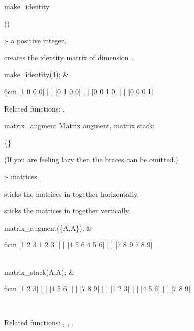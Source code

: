 \begin{Operator}{make_identity}

\begin{Syntax}
()
\end{Syntax}

 :- a positive integer.

 creates the identity matrix of dimension 
.

\begin{Examples}

make_identity(4); &
\begin{multilineoutput}{6cm}
[1  0  0  0]
[          ]
[0  1  0  0]
[          ]
[0  0  1  0]
[          ]
[0  0  0  1]
\end{multilineoutput}

\end{Examples}

Related functions: .

\end{Operator}


\begin{Operator}{matrix_augment}
Matrix augment, matrix stack:

\begin{Syntax}
 \{\}
\end{Syntax}

(If you are feeling lazy then the braces can be omitted.)

 :- matrices.

 sticks the matrices in 
together horizontally. 

 sticks the matrices in  
together vertically.


\begin{Examples}

matrix_augment(\{A,A\}); &
\begin{multilineoutput}{6cm}
[1  2  3  1  2  3]
[                ]
[4  5  6  4  5  6]
[                ]
[7  8  9  7  8  9]
\end{multilineoutput}\\

matrix_stack(A,A); &
\begin{multilineoutput}{6cm}
[1  2  3]
[       ]
[4  5  6]
[       ]
[7  8  9]
[       ]
[1  2  3]
[       ]
[4  5  6]
[       ]
[7  8  9]
\end{multilineoutput} \\

\end{Examples}

Related functions:
, , .

\end{Operator}


